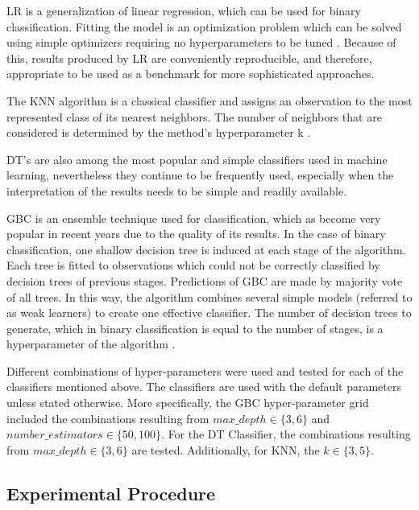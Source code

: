 \documentclass[parskip=full]{scrartcl}
\begin{document}
LR is a generalization of linear regression, which can be used for binary 
classification. Fitting the model is an optimization problem which can be 
solved using simple optimizers requiring no hyperparameters to be tuned 
\cite{McCullagh1989}. Because of this, results produced by LR are conveniently 
reproducible, and therefore, appropriate to be used as a benchmark for more 
sophisticated approaches.

The KNN algorithm is a classical classifier and assigns an observation to the 
most represented class of its nearest neighbors. The number of neighbors that 
are considered is determined by the method’s hyperparameter k \cite{Fix1989}. 

DT’s \cite{Breiman1984} are also among the most popular and simple classifiers 
used in machine learning, nevertheless they continue to be frequently used, 
especially when the interpretation of the results needs to be simple and 
readily available. 

GBC is an ensemble technique used for classification, which as become very 
popular in recent years due to the quality of its results. In the case of 
binary classification, one shallow decision tree is induced at each stage of 
the algorithm. Each tree is fitted to observations which could not be correctly 
classified by decision trees of previous stages. Predictions of GBC are made by 
majority vote of all trees. In this way, the algorithm combines several simple 
models (referred to as weak learners) to create one effective classifier. The 
number of decision trees to generate, which in binary classification is equal 
to the number of stages, is a hyperparameter of the algorithm 
\cite{Friedman2001}.

Different combinations of hyper-parameters were used and tested for each of the 
classifiers mentioned above. The classifiers are used with the default 
parameters unless stated otherwise. More specifically, the GBC hyper-parameter 
grid included the combinations resulting from $max\_depth \in \{3, 6\}$ and $number\_estimators \in \{50, 100\}$. For the DT Classifier, the combinations resulting from $max\_depth \in \{3, 6\}$ are tested. Additionally, for KNN, the $k \in \{3, 5\}$.

\subsection{Experimental Procedure}
\end{document}

